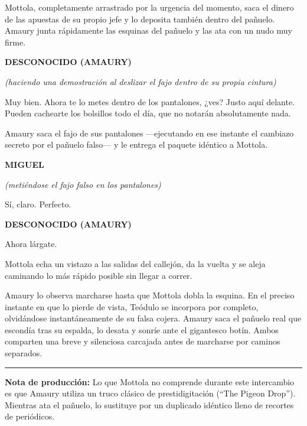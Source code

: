 \documentclass[11pt]{report}
\newenvironment{scenedesc}{\vspace{1em}\par\noindent\small\rmfamily}{\vspace{1em}}
\newenvironment{dialogue}[1]{
    \vspace{0.5em}\par\begin{center}\textbf{\MakeUppercase{#1}}\end{center}\vspace{-0.5em}
    \begin{list}{}{
        \leftmargin=1.5in
        \rightmargin=1.5in
        \parsep=0pt
    }\item[]
}{
    \end{list}\vspace{0.5em}
}
\newcommand{\parenthetical}[1]{\vspace{-0.3em}\begin{center}\textit{(#1)}\end{center}\vspace{-0.3em}}
\begin{document}
\begin{scenedesc}
Mottola, completamente arrastrado por la urgencia del momento, saca el dinero de las apuestas de su propio jefe y lo deposita también dentro del pañuelo. Amaury junta rápidamente las esquinas del pañuelo y las ata con un nudo muy firme.
\end{scenedesc}

\begin{dialogue}{Desconocido (Amaury)}
\parenthetical{haciendo una demostración al deslizar el fajo dentro de su propia cintura}
Muy bien. Ahora te lo metes dentro de los pantalones, ¿ves? Justo aquí delante. Pueden cachearte los bolsillos todo el día, que no notarán absolutamente nada.
\end{dialogue}

\begin{scenedesc}
Amaury saca el fajo de sus pantalones —ejecutando en ese instante el cambiazo secreto por el pañuelo falso— y le entrega el paquete idéntico a Mottola.
\end{scenedesc}

\begin{dialogue}{Miguel}
\parenthetical{metiéndose el fajo falso en los pantalones}
Sí, claro. Perfecto.
\end{dialogue}

\begin{dialogue}{Desconocido (Amaury)}
Ahora lárgate.
\end{dialogue}

\begin{scenedesc}
Mottola echa un vistazo a las salidas del callejón, da la vuelta y se aleja caminando lo más rápido posible sin llegar a correr.

Amaury lo observa marcharse hasta que Mottola dobla la esquina. En el preciso instante en que lo pierde de vista, Teódulo se incorpora por completo, olvidándose instantáneamente de su falsa cojera. Amaury saca el pañuelo real que escondía tras su espalda, lo desata y sonríe ante el gigantesco botín. Ambos comparten una breve y silenciosa carcajada antes de marcharse por caminos separados.
\end{scenedesc}

\vspace{2em}
\hrule
\vspace{1em}
\textbf{Nota de producción:} Lo que Mottola no comprende durante este intercambio es que Amaury utiliza un truco clásico de prestidigitación (``The Pigeon Drop''). Mientras ata el pañuelo, lo sustituye por un duplicado idéntico lleno de recortes de periódicos.
\end{document}
